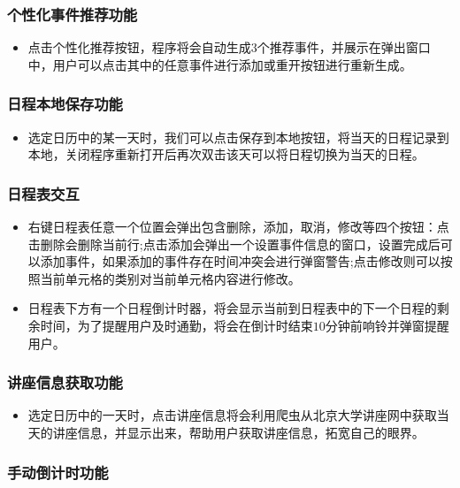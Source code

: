 \documentclass[11pt,hyperref,a4paper,UTF8]{ctexart}
\begin{document}
\begin{CJK}{UTF8}{gkai}
\subsubsection{个性化事件推荐功能}
\begin{itemize}
    \item 点击个性化推荐按钮，程序将会自动生成$3$个推荐事件，并展示在弹出窗口中，用户可以点击其中的任意事件进行添加或重开按钮进行重新生成。
\end{itemize}

\subsubsection{日程本地保存功能}
\begin{itemize}
    \item 选定日历中的某一天时，我们可以点击保存到本地按钮，将当天的日程记录到本地，关闭程序重新打开后再次双击该天可以将日程切换为当天的日程。
\end{itemize}


\subsubsection{日程表交互}
\begin{itemize}
    \item 右键日程表任意一个位置会弹出包含删除，添加，取消，修改等四个按钮：点击删除会删除当前行;点击添加会弹出一个设置事件信息的窗口，设置完成后可以添加事件，如果添加的事件存在时间冲突会进行弹窗警告;点击修改则可以按照当前单元格的类别对当前单元格内容进行修改。
    \item 日程表下方有一个日程倒计时器，将会显示当前到日程表中的下一个日程的剩余时间，为了提醒用户及时通勤，将会在倒计时结束$10$分钟前响铃并弹窗提醒用户。
\end{itemize}

\subsubsection{讲座信息获取功能}
\begin{itemize}
    \item 选定日历中的一天时，点击讲座信息将会利用爬虫从北京大学讲座网中获取当天的讲座信息，并显示出来，帮助用户获取讲座信息，拓宽自己的眼界。
\end{itemize}

\subsubsection{手动倒计时功能}



\end{CJK}
\end{document}
